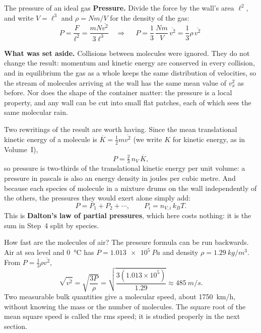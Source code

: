 \begin{derivbox}{The pressure of an ideal gas}
 \textbf{Pressure.} Divide the force by the wall's area $\ell^2$, and write $V=\ell^3$ and
$\rho = Nm/V$ for the density of the gas:
\[
P = \frac{F}{\ell^2} = \frac{mN\overline{v^2}}{3\ell^3}
\quad\Longrightarrow\quad
\boxed{\;P = \frac{1}{3}\,\frac{Nm}{V}\,\overline{v^2} = \frac{1}{3}\rho\,\overline{v^2}\;}
\]

 \textbf{What was set aside.} Collisions between molecules were ignored. They do not change the
result: momentum and kinetic energy are conserved in every collision, and in equilibrium the gas as a
whole keeps the same distribution of velocities, so the stream of molecules arriving at the wall has the
same mean value of $v_x^2$ as before. Nor does the shape of the container matter: the pressure is a local
property, and any wall can be cut into small flat patches, each of which sees the same molecular rain.
\end{derivbox}


Two rewritings of the result are worth having. Since the mean translational kinetic energy of a molecule
is $\overline K=\tfrac12m\overline{v^2}$ (we write $K$ for kinetic energy, as in Volume~I),
\[
P=\tfrac23\,n_V\,\overline K ,
\]
so pressure is two-thirds of the translational kinetic energy per unit volume: a pressure in pascals is
also an energy density in joules per cubic metre. And because each species of molecule in a mixture
drums on the wall independently of the others, the pressures they would exert alone simply add:
\[
P = P_1 + P_2 + \cdots, \qquad P_i = n_{V,i}\,k_BT .
\]
This is \textbf{Dalton's law of partial pressures}, which here costs nothing: it is the sum in Step~4
split by species.

\begin{exbox}{How fast are the molecules of air?}\label{ex:ktairspeed}
The pressure formula can be run backwards. Air at sea level and \SI{0}{\celsius} has
$P=\SI{1.013e5}{Pa}$ and density $\rho=\SI{1.29}{kg/m^3}$. From $P=\tfrac13\rho\overline{v^2}$,
\[
\sqrt{\overline{v^2}}=\sqrt{\frac{3P}{\rho}}=\sqrt{\frac{3(1.013\times10^5)}{1.29}}\approx\SI{485}{m/s}.
\]
Two measurable bulk quantities give a molecular speed, about \SI{1750}{km/h}, without knowing the mass or
the number of molecules. The square root of the mean square speed is called the rms speed; it is
studied properly in the next section. 
\end{exbox}

